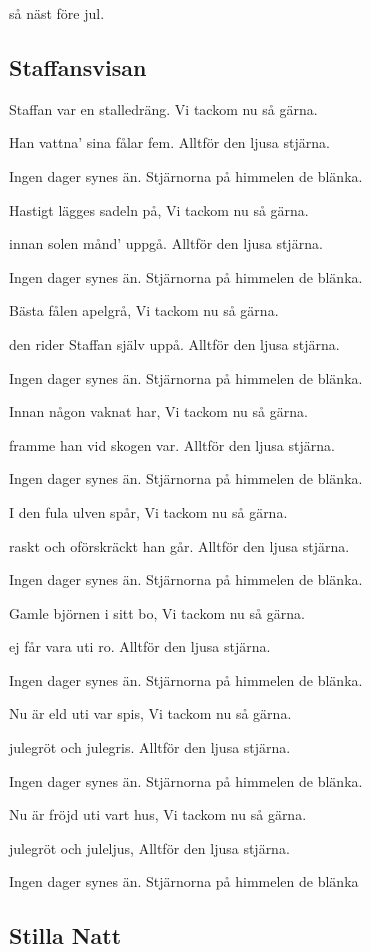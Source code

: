 så näst före jul.

\subsection{\textbf{Staffansvisan}}

Staffan var en stalledräng. Vi tackom nu så gärna.

Han vattna' sina fålar fem. Alltför den ljusa stjärna.

Ingen dager synes än. Stjärnorna på himmelen de blänka.\bigskip

Hastigt lägges sadeln på, Vi tackom nu så gärna.

innan solen månd' uppgå. Alltför den ljusa stjärna.

Ingen dager synes än. Stjärnorna på himmelen de blänka. \bigskip

Bästa fålen apelgrå, Vi tackom nu så gärna.

den rider Staffan själv uppå. Alltför den ljusa stjärna.

Ingen dager synes än. Stjärnorna på himmelen de blänka.\bigskip

Innan någon vaknat har, Vi tackom nu så gärna.

framme han vid skogen var. Alltför den ljusa stjärna.

Ingen dager synes än. Stjärnorna på himmelen de blänka.\bigskip

I den fula ulven spår, Vi tackom nu så gärna.

raskt och oförskräckt han går. Alltför den ljusa stjärna.

Ingen dager synes än. Stjärnorna på himmelen de blänka.\bigskip

Gamle björnen i sitt bo, Vi tackom nu så gärna.

ej får vara uti ro. Alltför den ljusa stjärna.

Ingen dager synes än. Stjärnorna på himmelen de blänka.\bigskip

Nu är eld uti var spis, Vi tackom nu så gärna.

julegröt och julegris. Alltför den ljusa stjärna.

Ingen dager synes än. Stjärnorna på himmelen de blänka.\bigskip

Nu är fröjd uti vart hus, Vi tackom nu så gärna.

julegröt och juleljus, Alltför den ljusa stjärna.

Ingen dager synes än. Stjärnorna på himmelen de blänka\bigskip

\subsection{\textbf{Stilla Natt}}


